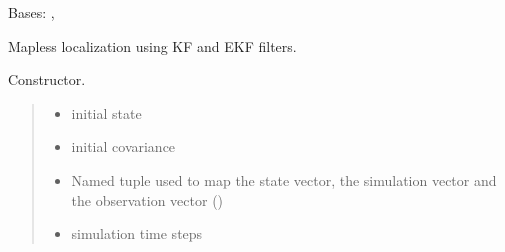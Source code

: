 \documentclass[letterpaper,10pt,english]{sphinxmanual}
\begin{document}
\begin{fulllineitems}
\label{\detokenize{GFLocalization:GFLocalization.GFLocalization}}
\pysigstartsignatures
{}
\pysigstopsignatures
\sphinxAtStartPar
Bases: {\hyperref[\detokenize{Localization:Localization.Localization}]{}}, 

\sphinxAtStartPar
Map\sphinxhyphen{}less localization using KF and EKF filters.

\begin{fulllineitems}
\label{\detokenize{GFLocalization:GFLocalization.GFLocalization.__init__}}
\pysigstartsignatures
{}
\pysigstopsignatures
\sphinxAtStartPar
Constructor.
\begin{quote}\begin{description}
\begin{itemize}
\item {} 
\sphinxAtStartPar
{} \textendash{} initial state

\item {} 
\sphinxAtStartPar
{} \textendash{} initial covariance

\item {} 
\sphinxAtStartPar
{} \textendash{} Named tuple used to map the state vector, the simulation vector and the observation vector ()

\item {} 
\sphinxAtStartPar
{} \textendash{} simulation time steps


\end{itemize}
\end{description}
\end{quote}
\end{fulllineitems}
\end{fulllineitems}
\end{document}
